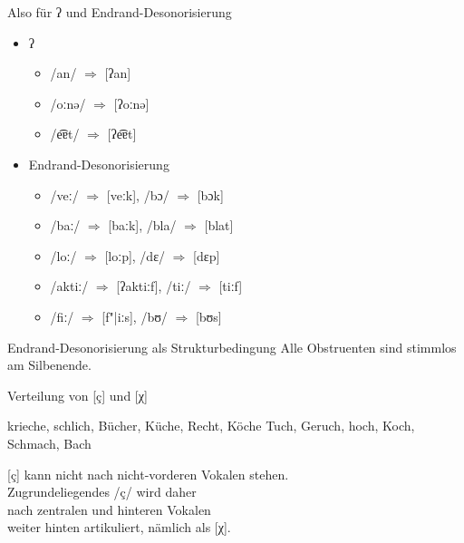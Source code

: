 \begin{frame}
  {Also für ʔ und Endrand-Desonorisierung}
  \pause
  \begin{itemize}[<+->]
    \item ʔ
      \begin{itemize}[<+->]
        \item /an/ $\Rightarrow$ [\alert{ʔ}an] 
        \item /oːnə/ $\Rightarrow$ [\alert{ʔ}oːnə]
        \item /e͡ɐt/ $\Rightarrow$ [\alert{ʔ}e͡ɐt]
      \end{itemize}
      \Zeile
    \item Endrand-Desonorisierung
      \begin{itemize}[<+->]
        \item /veː/ $\Rightarrow$ [veː\alert{k}], /bɔ/ $\Rightarrow$ [bɔ\alert{k}]
        \item /baː/ $\Rightarrow$ [baː\alert{k}], /bla/ $\Rightarrow$ [bla\alert{t}]
        \item /loː/ $\Rightarrow$ [loː\alert{p}], /dɛ/ $\Rightarrow$ [dɛ\alert{p}]
        \item /aktiː/ $\Rightarrow$ [ʔaktiː\alert{f}], /tiː/ $\Rightarrow$ [tiː\alert{f}]
        \item /fiː/ $\Rightarrow$ [f"|iː\alert{s}], /bʊ/ $\Rightarrow$ [bʊ\alert{s}]
      \end{itemize}
  \end{itemize}
\end{frame}


\begin{frame}
  {Endrand-Desonorisierung als Strukturbedingung}
  \pause
  \Large
  Alle \alert{Obstruenten} sind \alert{stimmlos} am \alert{Silbenende}.
\end{frame}


\begin{frame}
  {Verteilung von [ç] und [χ]}
  \pause
  \begin{exe}
    \ex
    \begin{xlist}
      \ex krieche, schlich, Bücher, Küche, Recht, Köche
      \pause
      \ex Tuch, Geruch, hoch, Koch, Schmach, Bach
    \end{xlist}
  \end{exe}
  \pause
  \Zeile
  \Large
  [ç] kann nicht nach nicht-vorderen Vokalen stehen.\\
  Zugrundeliegendes /ç/ wird daher\\
  nach zentralen und hinteren Vokalen\\
  weiter hinten artikuliert, nämlich als [χ].
\end{frame}

